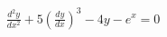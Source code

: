 \documentclass[preview]{standalone}
\begin{document}
\begin{align*}
\frac{d^2y}{dx^2} + 5 \left(\frac{dy}{dx}\right)^3 - 4y - e^x = 0
\end{align*}
\end{document}
